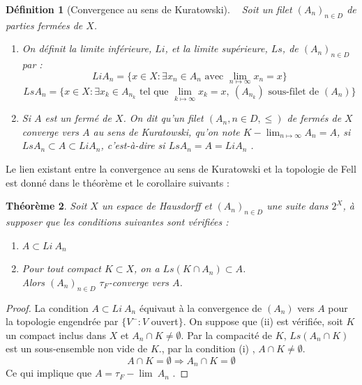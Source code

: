 \documentclass[11pt]{report}
\newenvironment{boxtheorem}
{\begin{tcolorbox}
		[enhanced jigsaw,breakable,pad at break*=2mm,
		colback=black!5,colframe=bleueLeger]}
	{\end{tcolorbox}}
\newenvironment{boxdefinition}
{\begin{tcolorbox}
		[enhanced jigsaw,breakable,pad at break*=1mm,
		colback=black!5!white,boxrule=0pt,frame hidden,
		borderline west={1.5mm}{-2mm}{blue}]}
	{\end{tcolorbox}}
\theoremstyle{styletheorem}
\newtheorem{theoreme}{Théorème}[section]
\newenvironment{theorem}
{\vspace*{0.3cm}\begin{boxtheorem}\begin{theoreme}}{\end{theoreme}\end{boxtheorem}\vspace*{0.3cm}}
\theoremstyle{styledef}
\newtheorem{definitions}[theoreme]{Définition}
\theoremstyle{remark}
\newenvironment{definition}{\vspace*{0.3cm}\begin{boxdefinition}\begin{definitions}}{\end{definitions}\end{boxdefinition}\vspace*{0.3cm}}
\newcommand{\ie}{c'est-à-dire }
\begin{document}
\begin{definition}[Convergence au sens de Kuratowski]\  \newline
	Soit un filet $(A_n)_{n \in D}$ de parties fermées de $X$.
	\begin{enumerate}[label = $\bullet$]
		\item On définit la limite inférieure, $Li$, et la limite supérieure, $Ls$, de $(A_n)_{n \in D}$ par :
		$$ Li A_n = \lbrace x \in X \colon \exists x_n \in A_n \text{ avec } \lim_{n\mapsto \infty} x_n =x \rbrace$$
		$$Ls A_n = \lbrace x \in X \colon \exists x_{k} \in A_{n_k} \text{ tel que } \lim_{k\mapsto \infty} x_k =x, \ (A_{n_k}) \text{ sous-filet de } (A_n)\rbrace$$ 
		
		\item Si $A$ est un fermé de $X$. On dit qu'un filet $(A_n, n \in D, \leq)$ de fermés de $X$ converge vers $A$ au sens de Kuratowski, qu'on note $K-\lim_{n\mapsto \infty} A_n = A$, si $Ls A_n \subset A \subset Li A_n$, \ie si $Ls A_n = A = Li A_n$ \cite{b8}.
	\end{enumerate}
	
	
	
	
\end{definition}
Le lien existant entre la convergence au sens de Kuratowski et la topologie de Fell est donné dans le théorème et le corollaire suivants :
\begin{theorem}
	Soit $X$ un espace de Hausdorff et $(A_n)_{n\in D}$ une suite dans $2^X$, à supposer que les conditions suivantes sont vérifiées : 
	\begin{enumerate}[label= (\roman*)]
		\item $A \subset Li\ A_n$
		
		\item Pour tout compact $K \subset X$, on a $Ls (K \cap A_n) \subset A$.\\
		Alors $(A_n)_{n \in D}$ $\tau_F$-converge vers $A$.
	\end{enumerate} 
\end{theorem}
\begin{proof}
	La condition $A \subset Li \ A_n$ équivaut à la convergence de $(A_n)$ vers $A$ pour la topologie engendrée par $\lbrace V^- \colon V$ ouvert$\rbrace$. On suppose que (ii) est vérifiée, soit  $K$ un compact inclus dans $X$ et $A_n \cap K \neq \emptyset$. Par la compacité de $K$, $Ls(A_n \cap K)$ est un sous-ensemble non vide de $K$., par la condition (i) , $A \cap K \neq \emptyset$.
	$$A\cap K = \emptyset \Rightarrow A_n \cap K = \emptyset$$
	Ce qui implique que $A= \tau_F-\lim \ A_n$ \cite{b8}.
\end{proof}
\end{document}
